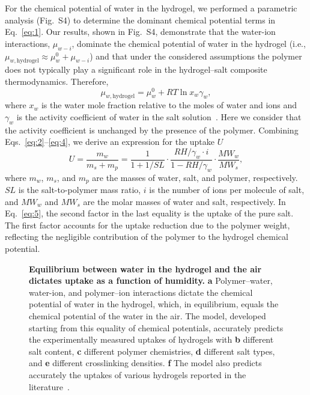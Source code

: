 \documentclass[11pt]{article}
\begin{document}
For the chemical potential of water in the hydrogel, we performed a parametric analysis (Fig.~S4) to determine the dominant chemical potential terms in Eq.~\ref{eq:1}. Our results, shown in Fig.~S4, demonstrate that the water-ion interactions, $\mu_{w-i}$, dominate the chemical potential of water in the hydrogel (i.e., $\mu_{w,\mathrm{hydrogel}} \approx \mu_w^0 + \mu_{w-i}$) and that under the considered assumptions the polymer does not typically play a significant role in the hydrogel--salt composite thermodynamics. Therefore,
\begin{equation}
\mu_{w,\mathrm{hydrogel}} = \mu_w^0 + RT \ln x_w \gamma_w,
\label{eq:4}
\end{equation}
where $x_w$ is the water mole fraction relative to the moles of water and ions and $\gamma_w$ is the activity coefficient of water in the salt solution~\cite{atkins2006}. Here we consider that the activity coefficient is unchanged by the presence of the polymer. Combining Eqs.~\ref{eq:2}--\ref{eq:4}, we derive an expression for the uptake $U$
\begin{equation}
U = \frac{m_w}{m_s + m_p} = \frac{1}{1 + 1/SL} \cdot \frac{RH/\gamma_w \cdot i}{1 - RH/\gamma_w} \cdot \frac{MW_w}{MW_s},
\label{eq:5}
\end{equation}
where $m_w$, $m_s$, and $m_p$ are the masses of water, salt, and polymer, respectively. $SL$ is the salt-to-polymer mass ratio, $i$ is the number of ions per molecule of salt, and $MW_w$ and $MW_s$ are the molar masses of water and salt, respectively. In Eq.~\ref{eq:5}, the second factor in the last equality is the uptake of the pure salt. The first factor accounts for the uptake reduction due to the polymer weight, reflecting the negligible contribution of the polymer to the hydrogel chemical potential.

\begin{figure}[t]
\centering
{}
\caption{\textbf{Equilibrium between water in the hydrogel and the air dictates uptake as a function of humidity.} \textbf{a} Polymer--water, water-ion, and polymer--ion interactions dictate the chemical potential of water in the hydrogel, which, in equilibrium, equals the chemical potential of the water in the air. The model, developed starting from this equality of chemical potentials, accurately predicts the experimentally measured uptakes of hydrogels with \textbf{b} different salt content, \textbf{c} different polymer chemistries, \textbf{d} different salt types, and \textbf{e} different crosslinking densities. \textbf{f} The model also predicts accurately the uptakes of various hydrogels reported in the literature~\cite{xu2021,guo2022,kallenberger2018,shan2023b}.}
\label{fig:fig3}
\end{figure}
\end{document}
